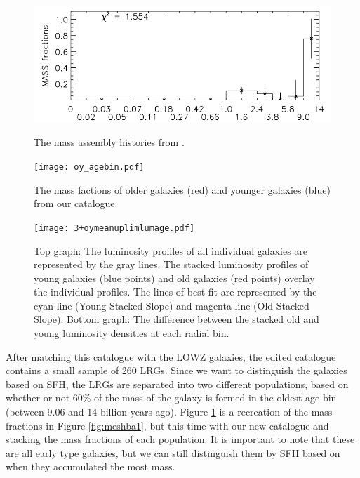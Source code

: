 \documentclass[apj]{emulateapj}
\begin{document}
\begin{figure}[htp!]
\centering
\begin{minipage}[b]{0.75\linewidth}
\includegraphics[width=\textwidth]{massfrac}
\caption{The mass assembly histories from \cite{Tojeiro:2009}.}
\label{fig:meshba1}
\end{minipage}
\quad
\begin{minipage}[b]{0.75\linewidth}
\texttt{[image: oy\_agebin.pdf]}
\caption{The mass factions of older galaxies (red) and younger galaxies (blue) from our catalogue.}
\label{fig:meshba2}
\end{minipage}
\end{figure}


\begin{figure}[htb!]
\centering
\texttt{[image: 3+oymeanuplimlumage.pdf]}
\caption{Top graph: The luminosity profiles of all individual galaxies are represented by the gray lines. The stacked luminosity profiles of young galaxies (blue points) and old galaxies (red points) overlay the individual profiles. The lines of best fit are represented by the cyan line (Young Stacked Slope) and magenta line (Old Stacked Slope). Bottom graph: The difference between the stacked old and young luminosity densities at each radial bin.}
\label{fig:mesh2}
\end{figure}

After matching this catalogue with the LOWZ galaxies, the edited catalogue contains a small sample of 260 LRGs. Since we want to distinguish the galaxies based on SFH, the LRGs are separated into two different populations, based on whether or not 60\% of the mass of the galaxy is formed in the oldest age bin (between 9.06 and 14 billion years ago). Figure \ref{fig:meshba2} is a recreation of the mass fractions in Figure \ref{fig:meshba1}, but this time with our new catalogue and stacking the mass fractions of each population. It is important to note that these are all early type galaxies, but we can still distinguish them by SFH based on when they accumulated the most mass. 
\end{document}
